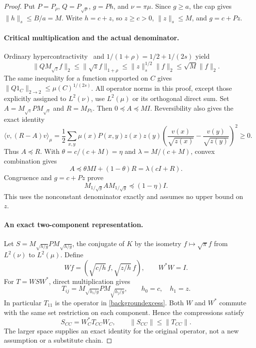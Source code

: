 \documentclass[11pt]{article}
\begin{document}
\begin{proof}
Put $P=P_\rho$, $Q=P_{\sqrt\rho}$, $g=Ph$, and $\nu=\pi\mu$.
Since $g\geq a$, the cap gives $\|h\|_s\leq B/a=M$.
Write $h=c+z$, so $z\geq c>0$, $\|z\|_s\leq M$, and $g=c+Pz$.

\paragraph{Critical multiplication and the actual denominator.}
Ordinary hypercontractivity~\cite{odonnelllecture} and
$1/(1+\rho)=1/2+1/(2s)$ yield
\[
 \|QM_{\sqrt z}f\|_2\leq\|\sqrt z f\|_{1+\rho}
 \leq\|z\|_s^{1/2}\|f\|_2\leq\sqrt M\|f\|_2.
\]
The same inequality for a function supported on $C$ gives
$\|Q1_C\|_{2\to2}\leq\mu(C)^{1/(2s)}$.
All operator norms in this proof, except those explicitly assigned to
$L^2(\nu)$, use $L^2(\mu)$ or its orthogonal direct sum.
Set $A=M_{\sqrt z}PM_{\sqrt z}$ and $R=M_{Pz}$. Then
$0\preceq A\preceq MI$. Reversibility also gives the exact identity
\[
 \langle v,(R-A)v\rangle_\mu
 =\frac12\sum_{x,y}\mu(x)P(x,y)z(x)z(y)
 \left(\frac{v(x)}{\sqrt{z(x)}}-
             \frac{v(y)}{\sqrt{z(y)}}\right)^2\geq0.
\]
Thus $A\preceq R$. With $\theta=c/(c+M)=\eta$ and
$\lambda=M/(c+M)$, convex combination gives
\[
 A\preceq\theta MI+(1-\theta)R=\lambda(cI+R).
\]
Congruence and $g=c+Pz$ prove
\begin{equation}\label{backgroundexcess}
 M_{1/\sqrt g} A M_{1/\sqrt g}\preceq(1-\eta)I.
\end{equation}
This uses the nonconstant denominator exactly and assumes no upper bound
on $z$.

\paragraph{An exact two-component representation.}
Let $S=M_{\sqrt{h/g}}PM_{\sqrt{h/g}}$, the conjugate of $K$ by the
isometry $f\mapsto\sqrt\pi f$ from $L^2(\nu)$ to $L^2(\mu)$.
Define
\[
 Wf=\left(\sqrt{c/h}\,f,\sqrt{z/h}\,f\right),\qquad W^*W=I.
\]
For $T=WSW^*$, direct multiplication gives
\[
 T_{ij}=M_{\sqrt{h_i/g}}PM_{\sqrt{h_j/g}},
 \qquad h_0=c,\quad h_1=z.
\]
In particular $T_{11}$ is the operator in \eqref{backgroundexcess}.
Both $W$ and $W^*$ commute with the same set restriction on each
component. Hence the compressions satisfy
\begin{equation}\label{backgroundcompression}
 S_{CC}=W_C^*T_{CC}W_C,\qquad\|S_{CC}\|\leq\|T_{CC}\|.
\end{equation}
The larger space supplies an exact identity for the original operator,
not a new assumption or a substitute chain.


\end{proof}
\end{document}
